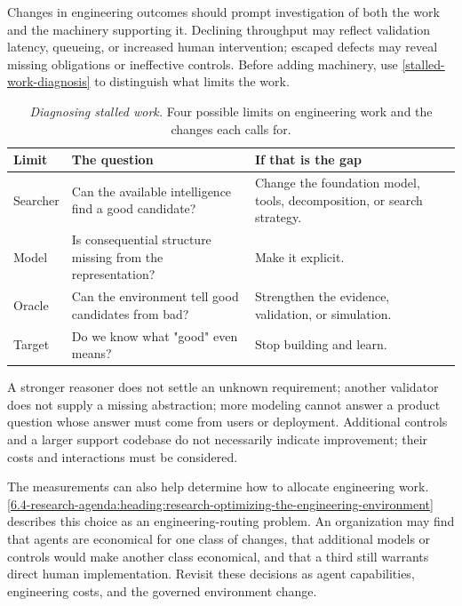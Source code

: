 Changes in engineering outcomes should prompt investigation of both the work and the machinery supporting it. Declining throughput may reflect validation latency, queueing, or increased human intervention; escaped defects may reveal missing obligations or ineffective controls. Before adding machinery, use \autoref{stalled-work-diagnosis} to distinguish what limits the work.

{\footnotesize
\begin{longtable}[]{@{}
  >{\raggedright\arraybackslash}p{}
  >{\raggedright\arraybackslash}p{}
  >{\raggedright\arraybackslash}p{}@{}}
\caption[Diagnosing stalled work]{\emph{Diagnosing stalled work.} Four possible limits on engineering work and the changes each calls for.}\label{stalled-work-diagnosis}\tabularnewline
\toprule\noalign{}
\begin{minipage}[b]{\linewidth}\raggedright
Limit
\end{minipage} & \begin{minipage}[b]{\linewidth}\raggedright
The question
\end{minipage} & \begin{minipage}[b]{\linewidth}\raggedright
If that is the gap
\end{minipage} \\
\midrule\noalign{}
\endhead
\bottomrule\noalign{}
\endlastfoot
Searcher & Can the available intelligence find a good candidate? & Change the foundation model, tools, decomposition, or search strategy. \\
Model & Is consequential structure missing from the representation? & Make it explicit. \\
Oracle & Can the environment tell good candidates from bad? & Strengthen the evidence, validation, or simulation. \\
Target & Do we know what "good" even means? & Stop building and learn. \\
\end{longtable}
}

A stronger reasoner does not settle an unknown requirement; another validator does not supply a missing abstraction; more modeling cannot answer a product question whose answer must come from users or deployment. Additional controls and a larger support codebase do not necessarily indicate improvement; their costs and interactions must be considered.

The measurements can also help determine how to allocate engineering work. \cref{6.4-research-agenda:heading:research-optimizing-the-engineering-environment} describes this choice as an engineering-routing problem. An organization may find that agents are economical for one class of changes, that additional models or controls would make another class economical, and that a third still warrants direct human implementation. Revisit these decisions as agent capabilities, engineering costs, and the governed environment change.

